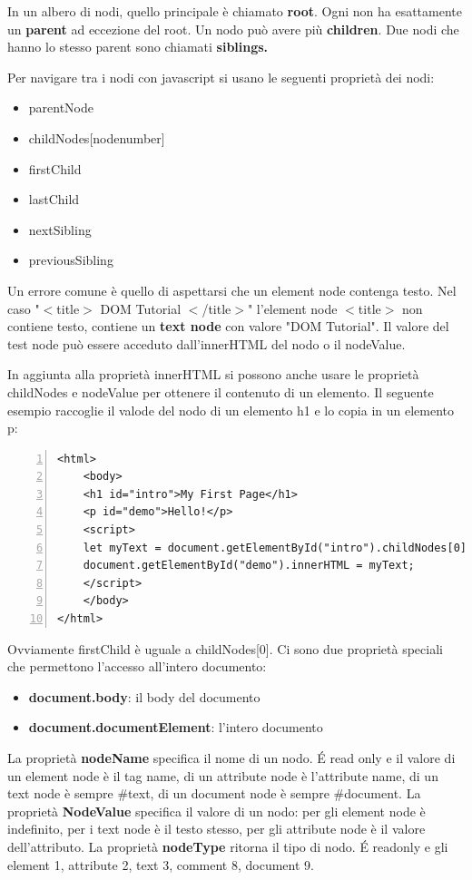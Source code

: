 In un albero di nodi, quello principale è chiamato \textbf{root}. Ogni non ha esattamente un \textbf{parent} ad eccezione del root. Un nodo può avere più \textbf{children}. Due nodi che hanno lo stesso parent sono chiamati \textbf{siblings.}

Per navigare tra i nodi con javascript si usano le seguenti proprietà dei nodi:
\begin{itemize}
    \item parentNode
    \item childNodes[nodenumber]
    \item firstChild
    \item lastChild
    \item nextSibling
    \item previousSibling
\end{itemize}
Un errore comune è quello di aspettarsi che un element node contenga testo. Nel caso "$<$title$>$ DOM Tutorial $<$/title$>$" l'element node $<$title$>$ non contiene testo, contiene un \textbf{text node} con valore "DOM Tutorial". Il valore del test node può essere acceduto dall'innerHTML del nodo o il nodeValue.

In aggiunta alla proprietà innerHTML si possono anche usare le proprietà childNodes e nodeValue per ottenere il contenuto di un elemento. Il seguente esempio raccoglie il valode del nodo di un elemento h1 e lo copia in un elemento p:
\begin{Verbatim}[frame = single, numbers = left]
<html>
    <body>
    <h1 id="intro">My First Page</h1>
    <p id="demo">Hello!</p>
    <script>
    let myText = document.getElementById("intro").childNodes[0].nodeValue;
    document.getElementById("demo").innerHTML = myText;
    </script>
    </body>
</html>
\end{Verbatim}
Ovviamente firstChild è uguale a childNodes[0]. Ci sono due proprietà speciali che permettono l'accesso all'intero documento:
\begin{itemize}
    \item \textbf{document.body}: il body del documento
    \item \textbf{document.documentElement}: l'intero documento
\end{itemize}

La proprietà \textbf{nodeName} specifica il nome di un nodo. \'E read only e il valore di un element node è il tag name, di un attribute node è l'attribute name, di un text node è sempre \#text, di un document node è sempre \#document. La proprietà  \textbf{NodeValue} specifica il valore di un nodo: per gli element node è indefinito, per i text node è il testo stesso, per gli attribute node è il valore dell'attributo. La proprietà \textbf{nodeType} ritorna il tipo di nodo. \'E readonly e gli element 1, attribute 2, text 3, comment 8, document 9.

